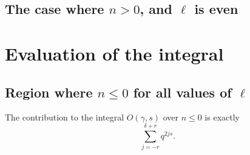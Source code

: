 \subsection{The case where $n > 0$, and $\ell$ is even}

\section{Evaluation of the integral}
\subsection{Region where $n \leq 0$ for all values of $\ell$}
\begin{proposition}
  The contribution to the integral $O(\gamma,s)$ over $n \leq 0$ is exactly
  \[ \sum_{j=-r}^{\delta+r} q^{2js}. \]
\end{proposition}
